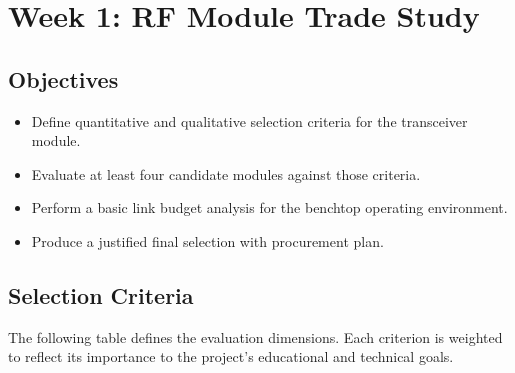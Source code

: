 \documentclass[11pt,letterpaper]{article}
\begin{document}
	\newpage
	\section{Week 1: RF Module Trade Study}
	\label{sec:tradestudy}
	
	\subsection{Objectives}
	
	\begin{itemize}[leftmargin=2em]
		\item Define quantitative and qualitative selection criteria for the \RF{} transceiver module.
		\item Evaluate at least four candidate modules against those criteria.
		\item Perform a basic link budget analysis for the benchtop operating environment.
		\item Produce a justified final selection with procurement plan.
	\end{itemize}
	
	\subsection{Selection Criteria}
	
	The following table defines the evaluation dimensions. Each criterion is weighted to reflect its importance to the project's educational and technical goals.
	
\end{document}
